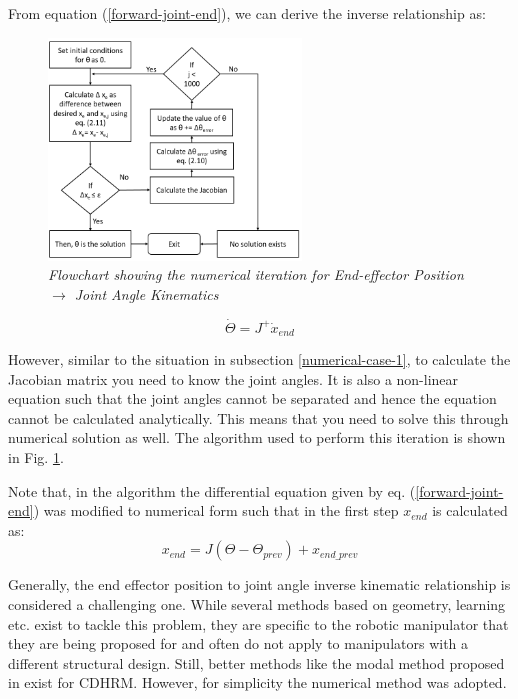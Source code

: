 \documentclass[a4paper,12pt]{report}
\begin{document}
From equation (\ref{forward-joint-end}), we can derive the inverse relationship as:
\begin{figure}
	\centering
	\vspace{-2mm}
	\includegraphics[width=0.6\textwidth]{images/Iteration_2.png}
	\caption{\textit{Flowchart showing the numerical iteration for End-effector Position $\longrightarrow$ Joint Angle Kinematics}}
	\label{iteration-2}
\end{figure}
\begin{equation}
\label{inv-g3}
\dot{\Theta}=J^{+}\dot{x}_{end}
\end{equation}

However, similar to the situation in subsection \ref{numerical-case-1}, to calculate the Jacobian matrix you need to know the joint angles. It is also a non-linear equation such that the joint angles cannot be separated and hence the equation cannot be calculated analytically. This means that you need to solve this through numerical solution as well. The algorithm used to perform this iteration is shown in Fig. \ref{iteration-2}.

Note that, in the algorithm the differential equation given by eq. (\ref{forward-joint-end}) was modified to numerical form such that in the first step $ x_{end} $ is calculated as:
\begin{equation}
x_{end}= J (\Theta - \Theta_{prev}) + x_{end\_prev} 
\end{equation}

Generally, the end effector position to joint angle inverse kinematic relationship is considered a challenging one. While several methods based on geometry, learning etc. exist to tackle this problem, they are specific to the robotic manipulator that they are being proposed for and often do not apply to manipulators with a different structural design. Still, better methods like the modal method proposed in \cite{RN50} exist for CDHRM. However, for simplicity the numerical method was adopted.
\end{document}
